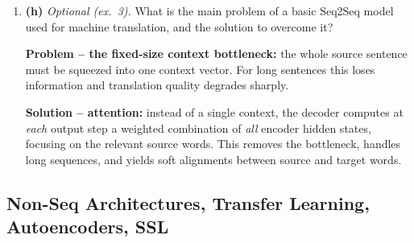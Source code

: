 \documentclass[10pt,a4paper]{article}
\newcommand{\q}[1]{\item #1}
\begin{document}
\begin{enumerate}[leftmargin=*,label=\textbf{Q\arabic*.}]
\q \textbf{(h)} \textit{Optional (ex.\ 3).} What is the main problem of a basic Seq2Seq model used for machine translation, and the solution to overcome it?
\begin{answerbox}
\textbf{Problem -- the fixed-size context bottleneck:} the whole source sentence must be squeezed into one context vector. For long sentences this loses information and translation quality degrades sharply.

\textbf{Solution -- attention:} instead of a single context, the decoder computes at \emph{each} output step a weighted combination of \emph{all} encoder hidden states, focusing on the relevant source words. This removes the bottleneck, handles long sequences, and yields soft alignments between source and target words.
\end{answerbox}

\end{enumerate}

\subsection{Non-Seq Architectures, Transfer Learning, Autoencoders, SSL}
\end{document}
